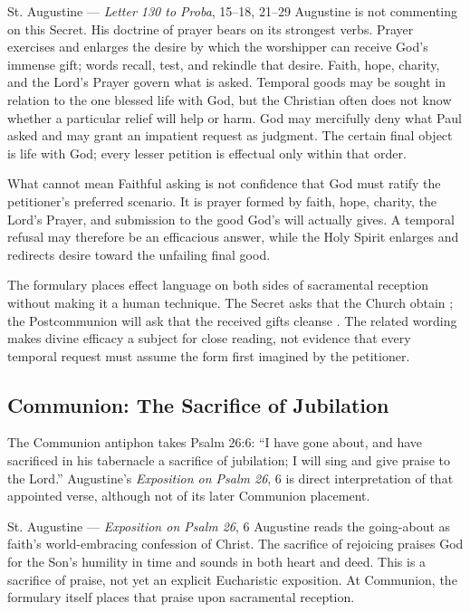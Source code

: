 \begin{sourcecard}{St. Augustine --- \emph{Letter 130 to Proba}, 15--18, 21--29}
Augustine is not commenting on this Secret. His doctrine of prayer bears on its strongest verbs. Prayer exercises and enlarges the desire by which the worshipper can receive God's immense gift; words recall, test, and rekindle that desire. Faith, hope, charity, and the Lord's Prayer govern what is asked. Temporal goods may be sought in relation to the one blessed life with God, but the Christian often does not know whether a particular relief will help or harm. God may mercifully deny what Paul asked and may grant an impatient request as judgment. The certain final object is life with God; every lesser petition is effectual only within that order.
\end{sourcecard}

\begin{studybox}{What  cannot mean}
Faithful asking is not confidence that God must ratify the petitioner's preferred scenario. It is prayer formed by faith, hope, charity, the Lord's Prayer, and submission to the good God's will actually gives. A temporal refusal may therefore be an efficacious answer, while the Holy Spirit enlarges and redirects desire toward the unfailing final good.
\end{studybox}

The formulary places effect language on both sides of sacramental reception without making it a human technique. The Secret asks that the Church obtain ; the Postcommunion will ask that the received gifts cleanse . The related wording makes divine efficacy a subject for close reading, not evidence that every temporal request must assume the form first imagined by the petitioner.

\sectionguard
\subsection*{Communion: The Sacrifice of Jubilation\enspace{}}

The Communion antiphon takes Psalm 26:6: ``I have gone about, and have sacrificed in his tabernacle a sacrifice of jubilation; I will sing and give praise to the Lord.'' Augustine's \emph{Exposition on Psalm 26}, 6 is direct interpretation of that appointed verse, although not of its later Communion placement.

\begin{sourcecard}{St. Augustine --- \emph{Exposition on Psalm 26}, 6}
Augustine reads the going-about as faith's world-embracing confession of Christ. The sacrifice of rejoicing praises God for the Son's humility in time and sounds in both heart and deed. This is a sacrifice of praise, not yet an explicit Eucharistic exposition. At Communion, the formulary itself places that praise upon sacramental reception.
\end{sourcecard}

